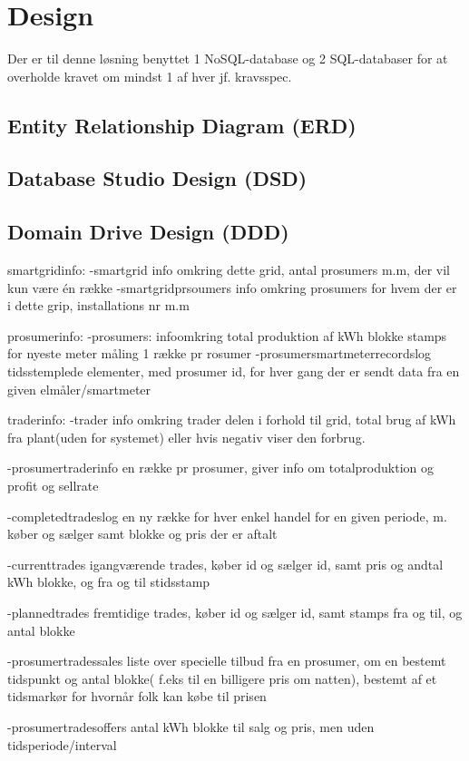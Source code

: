 
\section{Design}

Der er til denne løsning benyttet 1 NoSQL-database og 2 SQL-databaser for at overholde kravet om mindst 1 af hver jf. kravsspec.

\subsection{Entity Relationship Diagram (ERD)}

\subsection{Database Studio Design (DSD)}

\subsection{Domain Drive Design (DDD)}





smartgridinfo:
-smartgrid
    info omkring dette grid, antal prosumers m.m, der vil kun være én række
-smartgridprsoumers
    info omkring prosumers for hvem der er i dette grip, installations nr m.m

prosumerinfo:
-prosumers:
    infoomkring total produktion af kWh blokke
    stamps for nyeste meter måling 1 række pr rosumer
-prosumersmartmeterrecordslog
    tidsstemplede elementer, med prosumer id, for hver gang der er sendt data fra en given elmåler/smartmeter


traderinfo:
-trader
    info omkring trader delen i forhold til grid, total brug af kWh fra plant(uden for systemet) eller hvis negativ viser den forbrug. 

-prosumertraderinfo
    en række pr prosumer, giver info om totalproduktion og profit og sellrate

-completedtradeslog
    en ny række for hver enkel handel for en given periode, m. køber og sælger samt blokke og pris der er aftalt

-currenttrades
    igangværende trades, køber id og sælger id, samt pris og andtal kWh blokke, og fra og til stidsstamp

-plannedtrades
    fremtidige trades, køber id og sælger id, samt stamps fra og til, og antal blokke

-prosumertradessales
    liste over specielle tilbud fra en prosumer, om en bestemt tidspunkt og antal blokke( f.eks til en billigere pris om natten), bestemt af et tidsmarkør for hvornår folk kan købe til prisen

-prosumertradesoffers
    antal kWh blokke til salg og pris, men uden tidsperiode/interval